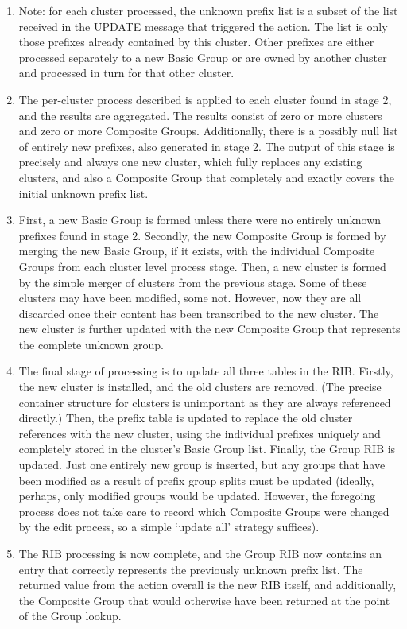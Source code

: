 \begin{enumerate}
	\item Note: for each cluster processed, the unknown prefix list is a subset of the list received in the UPDATE message that triggered the action. The list is only those prefixes already contained by this cluster. Other prefixes are either processed separately to a new Basic Group or are owned by another cluster and processed in turn for that other cluster.
	\item The per-cluster process described is applied to each cluster found in stage 2, and the results are aggregated. The results consist of zero or more clusters and zero or more Composite Groups. Additionally, there is a possibly null list of entirely new prefixes, also generated in stage 2. The output of this stage is precisely and always one new cluster, which fully replaces any existing clusters, and also a Composite Group that completely and exactly covers the initial unknown prefix list.
	\item First, a new Basic Group is formed unless there were no entirely unknown prefixes found in stage 2. Secondly, the new Composite Group is formed by merging the new Basic Group, if it exists, with the individual Composite Groups from each cluster level process stage. Then, a new cluster is formed by the simple merger of clusters from the previous stage. Some of these clusters may have been modified, some not. However, now they are all discarded once their content has been transcribed to the new cluster. The new cluster is further updated with the new Composite Group that represents the complete unknown group.
	\item The final stage of processing is to update all three tables in the RIB. Firstly, the new cluster is installed, and the old clusters are removed. (The precise container structure for clusters is unimportant as they are always referenced directly.) Then, the prefix table is updated to replace the old cluster references with the new cluster, using the individual prefixes uniquely and completely stored in the cluster's Basic Group list. Finally, the Group RIB is updated. Just one entirely new group is inserted, but any groups that have been modified as a result of prefix group splits must be updated (ideally, perhaps, only modified groups would be updated. However, the foregoing process does not take care to record which Composite Groups were changed by the edit process, so a simple `update all' strategy suffices).
	\item The RIB processing is now complete, and the Group RIB now contains an entry that correctly represents the previously unknown prefix list. The returned value from the action overall is the new RIB itself, and additionally, the Composite Group that would otherwise have been returned at the point of the Group lookup.
\end{enumerate}

